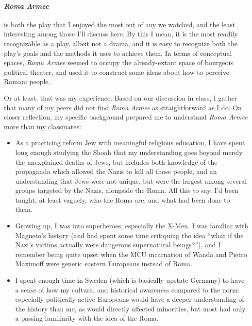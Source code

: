 \clearpage{}

\paragraph{\textit{Roma Armee}} is both the play that I enjoyed the most out of any we
watched, and the least interesting among those I'll discuss here. By this I mean, it is
the most readily recognizable as a play, albeit not a drama, and it is easy to recognize
both the play's goals and the methods it uses to achieve them. In terms of conceptual
spaces, \textit{Roma Armee} seemed to occupy the already-extant space of bourgeois
political theater, and used it to construct some ideas about how to perceive Romani
people.

Or at least, that was my experience. Based on our discussion in class, I gather that many
of my peers did not find \textit{Roma Armee} as straightforward as I do. On closer
reflection, my specific background prepared me to understand \textit{Roma Armee} more than
my classmates:

\begin{itemize}
\item As a practicing reform Jew with meaningful religious education, I have spent long
  enough studying the Shoah that my understanding goes beyond merely the unexplained
  deaths of Jews, but includes both knowledge of the propaganda which allowed the Nazis to
  kill all those people, and an understanding that Jews were not unique, but were the
  largest among several groups targeted by the Nazis, alongside the Roma. All this to say,
  I'd been taught, at least vaguely, who the Roma are, and what had been done to them.

\item Growing up, I was into superheroes, especially the X-Men. I was familiar with
  Magneto's history (and had spent some time critiquing the idea \enquote{what if the
    Nazi's victims actually were dangerous supernatural beings?}), and I remember being
  quite upset when the MCU incarnation of Wanda and Pietro Maximoff were generic eastern
  Europeans instead of Roma.

\item I spent enough time in Sweden (which is basically upstate Germany) to have a sense
  of how my cultural and historical awareness compared to the norm: especially politically
  active Europeans would have a deeper understanding of the history than me, as would
  directly affected minorities, but most had only a passing familiarity with the idea of
  the Roma.
\end{itemize}

